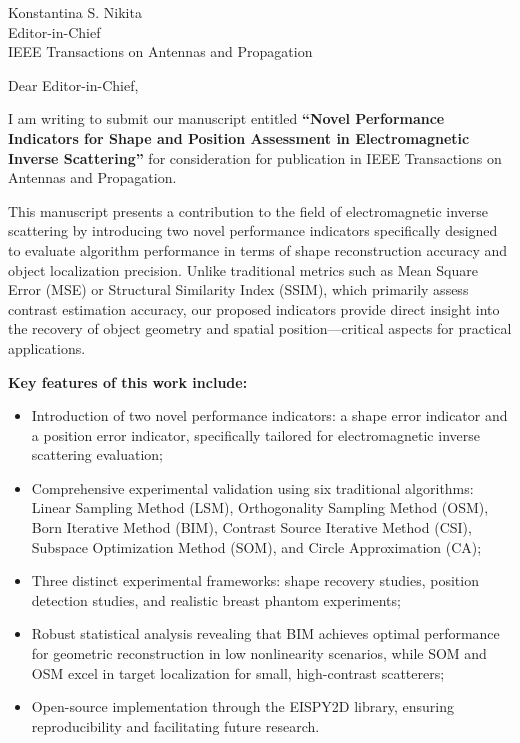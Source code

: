 \documentclass[11pt]{letter}
\begin{document}
\date{\today}

\begin{letter}{
Konstantina S. Nikita\\
Editor-in-Chief\\
IEEE Transactions on Antennas and Propagation\\
}

\opening{Dear Editor-in-Chief,}

I am writing to submit our manuscript entitled \textbf{``Novel Performance Indicators for Shape and Position Assessment in Electromagnetic Inverse Scattering''} for consideration for publication in IEEE Transactions on Antennas and Propagation.

This manuscript presents a contribution to the field of electromagnetic inverse scattering by introducing two novel performance indicators specifically designed to evaluate algorithm performance in terms of shape reconstruction accuracy and object localization precision. Unlike traditional metrics such as Mean Square Error (MSE) or Structural Similarity Index (SSIM), which primarily assess contrast estimation accuracy, our proposed indicators provide direct insight into the recovery of object geometry and spatial position—critical aspects for practical applications.

\textbf{Key features of this work include:}

\begin{itemize}
    \item Introduction of two novel performance indicators: a shape error indicator and a position error indicator, specifically tailored for electromagnetic inverse scattering evaluation;
    \item Comprehensive experimental validation using six traditional algorithms: Linear Sampling Method (LSM), Orthogonality Sampling Method (OSM), Born Iterative Method (BIM), Contrast Source Iterative Method (CSI), Subspace Optimization Method (SOM), and Circle Approximation (CA);
    \item Three distinct experimental frameworks: shape recovery studies, position detection studies, and realistic breast phantom experiments;
    \item Robust statistical analysis revealing that BIM achieves optimal performance for geometric reconstruction in low nonlinearity scenarios, while SOM and OSM excel in target localization for small, high-contrast scatterers;
    \item Open-source implementation through the EISPY2D library, ensuring reproducibility and facilitating future research.
\end{itemize}


\end{letter}
\end{document}
